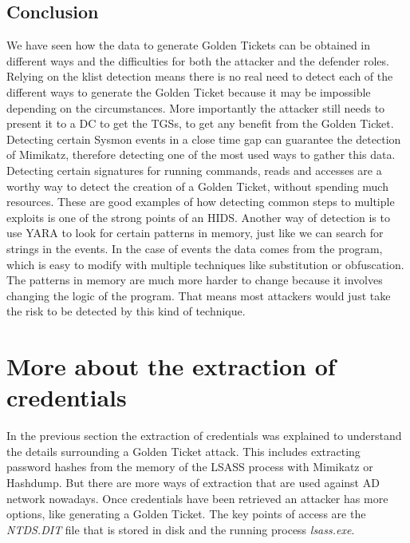 \subsection{Conclusion}
We have seen how the data to generate Golden Tickets can be obtained in different ways and the difficulties for both the attacker and the defender roles.
\linej
\linej
Relying on the klist detection means there is no real need to detect each of the different ways to generate the Golden Ticket because it may be impossible depending on the circumstances. More importantly the attacker still needs to present it to a DC to get the TGSs, to get any benefit from the Golden Ticket.
\linej
Detecting certain Sysmon events in a close time gap can guarantee the detection of Mimikatz, therefore detecting one of the most used ways to gather this data. Detecting certain signatures for running commands, reads and accesses are a worthy way to detect the creation of a Golden Ticket, without spending much resources.
\linej
These are good examples of how detecting common steps to multiple exploits is one of the strong points of an HIDS.
\linej
\linej
Another way of detection is to use YARA to look for certain patterns in memory, just like we can search for strings in the events. In the case of events the data comes from the program, which is easy to modify with multiple techniques like substitution or obfuscation. The patterns in memory are much more harder to change because it involves changing the logic of the program. That means most attackers would just take the risk to be detected by this kind of technique.


\section{More about the extraction of credentials}
In the previous section the extraction of credentials was explained to understand the details surrounding a Golden Ticket attack. This includes extracting password hashes from the memory of the LSASS process with Mimikatz or Hashdump. But there are more ways of extraction that are used against AD network nowadays.
\linej
Once credentials have been retrieved an attacker has more options, like generating a Golden Ticket.
The key points of access are the \textit{NTDS.DIT} file that is stored in disk and the running process \textit{lsass.exe}.

